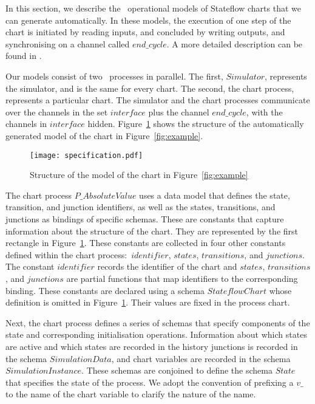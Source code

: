 \documentclass[submission]{eptcs}
\begin{document}
In this section, we describe the \Circus~operational models of Stateflow
charts that we can generate automatically. In these models, 
the execution of one step of the chart is initiated by
reading inputs, and concluded by writing outputs, and synchronising
on a channel called $end\_cycle$. A more detailed description
can be found in \cite{Miyazawa2011,Miyazawa2011a}.

Our models consist of two \Circus~processes in parallel. The
first, $Simulator$, represents the simulator, and is the same for every chart.
The second, the chart process, represents a particular chart.
The simulator and the chart processes communicate over the channels in the set $interface$ plus
the channel $end\_cycle$, with the channels in $interface$ hidden.
Figure~\ref{fig:model} shows the structure of the automatically
generated model of the chart in Figure~\ref{fig:example}.

\begin{figure}[t]
\centering
\texttt{[image: specification.pdf]}
\caption{Structure of the model of the chart in Figure~\ref{fig:example}}
\label{fig:model}
\end{figure}



The chart process $P\_AbsoluteValue$ uses a data model that defines the state, transition, and junction identifiers, as well as the states, transitions, and junctions as bindings of specific schemas. These are constants that capture information about the structure of the chart. They are represented by the first rectangle in Figure~\ref{fig:model}.
These constants are collected in four other constants defined within the chart process:~$identifier$, $states$, $transitions$, and $junctions$. The constant $identifier$ records the identifier of the chart and $states$, $transitions$, and $junctions$ are partial functions that map identifiers to the corresponding binding. These constants are declared using a schema $StateflowChart$ whose definition is omitted in Figure~\ref{fig:model}. Their values are fixed in the process chart.

Next, the chart process defines a series of schemas that specify components of the state and corresponding initialisation operations. Information about which states are active and which states are recorded in the history junctions is recorded in the schema $SimulationData$, and chart variables are recorded in the schema $SimulationInstance$. These schemas are conjoined to define the schema $State$ that specifies the state of the process. We adopt the convention of prefixing a $v\_$ to the name of the chart variable to clarify the nature of the name.
\end{document}

